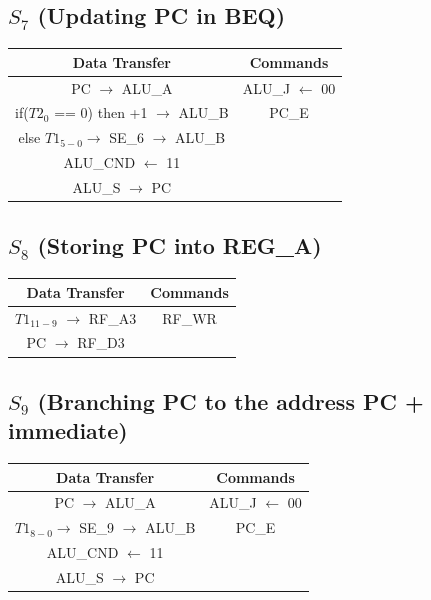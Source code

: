 \documentclass[]{report}
\begin{document}
        \subsection*{$S_7$ (Updating PC in BEQ)} %
        \begin{center}
            \begin{tabular}{|c|c|}
                \hline
                Data Transfer & Commands \\
                \hline
                PC $\to$ ALU\_A & ALU\_J $\leftarrow$ 00\\
                if($T2_0$ == 0) then +1 $\to$ ALU\_B & PC\_E\\
                else $T1_{5-0} \to$ SE\_6 $\to$ ALU\_B & \\
                ALU\_CND $\leftarrow$ 11 & \\
                ALU\_S $\to$ PC & \\
                \hline
            \end{tabular}
        \end{center}
        \subsection*{$S_8$ (Storing PC into REG\_A)} %
        \begin{center}
            \begin{tabular}{|c|c|}
                \hline
                Data Transfer & Commands \\
                \hline
                $T1_{11-9}$ $\to$ RF\_A3 & RF\_WR\\
                PC $\to$ RF\_D3 & \\
                \hline
            \end{tabular}
        \end{center}
        \subsection*{$S_9$ (Branching PC to the address PC + immediate)} %
        \begin{center}
            \begin{tabular}{|c|c|}
                \hline
                Data Transfer & Commands \\
                \hline
                PC $\to$ ALU\_A & ALU\_J $\leftarrow$ 00\\
                $T1_{8-0} \to$ SE\_9 $\to$ ALU\_B & PC\_E\\
                ALU\_CND $\leftarrow$ 11 & \\
                ALU\_S $\to$ PC & \\
                \hline
            \end{tabular}
        \end{center}
\end{document}
